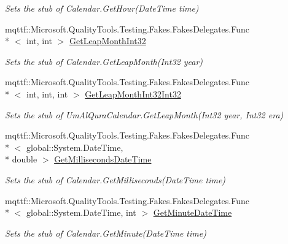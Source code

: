 \begin{DoxyCompactItemize}
\begin{DoxyCompactList}\small\item\em Sets the stub of Calendar.\-Get\-Hour(\-Date\-Time time)\end{DoxyCompactList}\item 
mqttf\-::\-Microsoft.\-Quality\-Tools.\-Testing.\-Fakes.\-Fakes\-Delegates.\-Func\\*
$<$ int, int $>$ \hyperlink{class_system_1_1_globalization_1_1_fakes_1_1_stub_um_al_qura_calendar_a9d9cb0d1a5225c96a24d2569b2e5f48c}{Get\-Leap\-Month\-Int32}
\begin{DoxyCompactList}\small\item\em Sets the stub of Calendar.\-Get\-Leap\-Month(\-Int32 year)\end{DoxyCompactList}\item 
mqttf\-::\-Microsoft.\-Quality\-Tools.\-Testing.\-Fakes.\-Fakes\-Delegates.\-Func\\*
$<$ int, int, int $>$ \hyperlink{class_system_1_1_globalization_1_1_fakes_1_1_stub_um_al_qura_calendar_a1fcdd621d1f40c85bb54f08119f11fd7}{Get\-Leap\-Month\-Int32\-Int32}
\begin{DoxyCompactList}\small\item\em Sets the stub of Um\-Al\-Qura\-Calendar.\-Get\-Leap\-Month(\-Int32 year, Int32 era)\end{DoxyCompactList}\item 
mqttf\-::\-Microsoft.\-Quality\-Tools.\-Testing.\-Fakes.\-Fakes\-Delegates.\-Func\\*
$<$ global\-::\-System.\-Date\-Time, \\*
double $>$ \hyperlink{class_system_1_1_globalization_1_1_fakes_1_1_stub_um_al_qura_calendar_a9493c2968bfa51331a46655cac5825ce}{Get\-Milliseconds\-Date\-Time}
\begin{DoxyCompactList}\small\item\em Sets the stub of Calendar.\-Get\-Milliseconds(\-Date\-Time time)\end{DoxyCompactList}\item 
mqttf\-::\-Microsoft.\-Quality\-Tools.\-Testing.\-Fakes.\-Fakes\-Delegates.\-Func\\*
$<$ global\-::\-System.\-Date\-Time, int $>$ \hyperlink{class_system_1_1_globalization_1_1_fakes_1_1_stub_um_al_qura_calendar_a94011ff246509a1beb99a3312c6e6c4a}{Get\-Minute\-Date\-Time}
\begin{DoxyCompactList}\small\item\em Sets the stub of Calendar.\-Get\-Minute(\-Date\-Time time)\end{DoxyCompactList}\item 

\end{DoxyCompactItemize}
